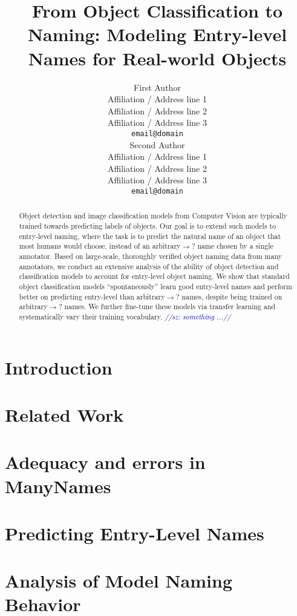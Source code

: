 \documentclass[11pt,a4paper]{article}
\title{From Object Classification to Naming: Modeling Entry-level Names for Real-world Objects}
\author{First Author \\
  Affiliation / Address line 1 \\
  Affiliation / Address line 2 \\
  Affiliation / Address line 3 \\
  \texttt{email@domain} \\\And
  Second Author \\
  Affiliation / Address line 1 \\
  Affiliation / Address line 2 \\
  Affiliation / Address line 3 \\
  \texttt{email@domain} \\}
\date{}
\newcommand{\sz}[1]{\textcolor{blue}{\emph{//sz: #1//}}}
\newcommand{\cs}[1]{\textcolor{green!60!black}{\emph{//cs: #1//}}}
\newcommand{\mn}{ManyNames\xspace}
\newcommand{\arbitrary}{arbitrary$\rightarrow$?\xspace}
\begin{document}
\maketitle
\begin{abstract}
Object detection and image classification models from Computer Vision are typically trained towards predicting labels of objects. 
Our goal is to extend such models to entry-level naming, where the task is to predict the natural name of an object that most humans would choose, instead of an \arbitrary name chosen by a single annotator. 
Based on large-scale, thoroughly verified object naming data from many annotators, we conduct an extensive analysis of the ability of object detection and classification models to account for entry-level object naming.
We show that standard object classification models ``spontaneously'' learn good entry-level names and perform better
on predicting entry-level than \arbitrary names, despite being trained on  \arbitrary names.
We further fine-tune these models via transfer learning and systematically vary their training vocabulary.
\sz{something ...}
\end{abstract}

\section{Introduction}
\label{sec:intro}


\section{Related Work}
\label{sec:related}


\section{Adequacy and errors in ManyNames}
\label{sec:manynames}


\section{Predicting Entry-Level Names}
\label{sec:experiments}


\section{Analysis of Model Naming Behavior}
\label{sec:analysis}

\end{document}
